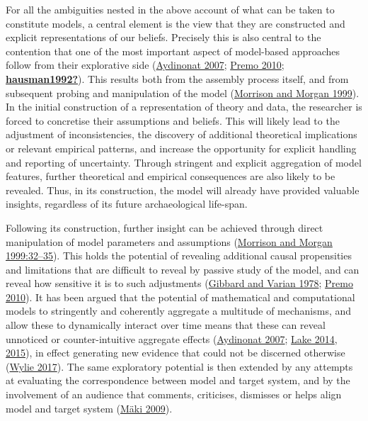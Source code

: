 \documentclass[
  12pt,
  a4paper,
  oneside]{book}
\begin{document}
For all the ambiguities nested in the above account of what can be taken to constitute models, a central element is the view that they are constructed and explicit representations of our beliefs. Precisely this is also central to the contention that one of the most important aspect of model-based approaches follow from their explorative side (\protect\hyperlink{ref-aydinonat2007}{Aydinonat 2007}; \protect\hyperlink{ref-premo2010}{Premo 2010}; \protect\hyperlink{ref-hausman1992}{\textbf{hausman1992?}}). This results both from the assembly process itself, and from subsequent probing and manipulation of the model (\protect\hyperlink{ref-morrison1999}{Morrison and Morgan 1999}). In the initial construction of a representation of theory and data, the researcher is forced to concretise their assumptions and beliefs. This will likely lead to the adjustment of inconsistencies, the discovery of additional theoretical implications or relevant empirical patterns, and increase the opportunity for explicit handling and reporting of uncertainty. Through stringent and explicit aggregation of model features, further theoretical and empirical consequences are also likely to be revealed. Thus, in its construction, the model will already have provided valuable insights, regardless of its future archaeological life-span.

Following its construction, further insight can be achieved through direct manipulation of model parameters and assumptions (\protect\hyperlink{ref-morrison1999}{Morrison and Morgan 1999:32--35}). This holds the potential of revealing additional causal propensities and limitations that are difficult to reveal by passive study of the model, and can reveal how sensitive it is to such adjustments (\protect\hyperlink{ref-gibbard1978}{Gibbard and Varian 1978}; \protect\hyperlink{ref-premo2010}{Premo 2010}). It has been argued that the potential of mathematical and computational models to stringently and coherently aggregate a multitude of mechanisms, and allow these to dynamically interact over time means that these can reveal unnoticed or counter-intuitive aggregate effects (\protect\hyperlink{ref-aydinonat2007}{Aydinonat 2007}; \protect\hyperlink{ref-lake2014}{Lake 2014}, \protect\hyperlink{ref-lake2015}{2015}), in effect generating new evidence that could not be discerned otherwise (\protect\hyperlink{ref-wylie2017}{Wylie 2017}). The same exploratory potential is then extended by any attempts at evaluating the correspondence between model and target system, and by the involvement of an audience that comments, criticises, dismisses or helps align model and target system (\protect\hyperlink{ref-muxe4ki2009}{Mäki 2009}).
\end{document}
